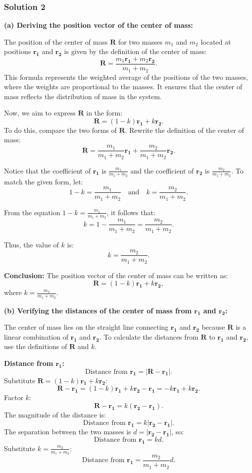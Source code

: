 \documentclass{article}
\begin{document}
\subsubsection{Solution 2}

\textbf{(a) Deriving the position vector of the center of mass:}

The position of the center of mass $\mathbf{R}$ for two masses $m_1$ and $m_2$ located at positions $\mathbf{r_1}$ and $\mathbf{r_2}$ is given by the definition of the center of mass:
\[
\mathbf{R} = \frac{m_1\mathbf{r_1} + m_2\mathbf{r_2}}{m_1 + m_2}.
\]
This formula represents the weighted average of the positions of the two masses, where the weights are proportional to the masses. It ensures that the center of mass reflects the distribution of mass in the system.

Now, we aim to express $\mathbf{R}$ in the form:
\[
\mathbf{R} = (1 - k)\mathbf{r_1} + k\mathbf{r_2}.
\]
To do this, compare the two forms of $\mathbf{R}$. Rewrite the definition of the center of mass:
\[
\mathbf{R} = \frac{m_1}{m_1 + m_2}\mathbf{r_1} + \frac{m_2}{m_1 + m_2}\mathbf{r_2}.
\]

Notice that the coefficient of $\mathbf{r_1}$ is $\frac{m_1}{m_1 + m_2}$ and the coefficient of $\mathbf{r_2}$ is $\frac{m_2}{m_1 + m_2}$. To match the given form, let:
\[
1 - k = \frac{m_1}{m_1 + m_2} \quad \text{and} \quad k = \frac{m_2}{m_1 + m_2}.
\]

From the equation $1 - k = \frac{m_1}{m_1 + m_2}$, it follows that:
\[
k = 1 - \frac{m_1}{m_1 + m_2} = \frac{m_2}{m_1 + m_2}.
\]

Thus, the value of $k$ is:
\[
k = \frac{m_2}{m_1 + m_2}.
\]

\textbf{Conclusion:} The position vector of the center of mass can be written as:
\[
\mathbf{R} = (1 - k)\mathbf{r_1} + k\mathbf{r_2},
\]
where $k = \frac{m_2}{m_1 + m_2}$.

\textbf{(b) Verifying the distances of the center of mass from $\mathbf{r_1}$ and $\mathbf{r_2}$:}

The center of mass lies on the straight line connecting $\mathbf{r_1}$ and $\mathbf{r_2}$ because $\mathbf{R}$ is a linear combination of $\mathbf{r_1}$ and $\mathbf{r_2}$. To calculate the distances from $\mathbf{R}$ to $\mathbf{r_1}$ and $\mathbf{r_2}$, use the definitions of $\mathbf{R}$ and $k$.

\textbf{Distance from $\mathbf{r_1}$:}
\[
\text{Distance from } \mathbf{r_1} = |\mathbf{R} - \mathbf{r_1}|.
\]
Substitute $\mathbf{R} = (1 - k)\mathbf{r_1} + k\mathbf{r_2}$:
\[
\mathbf{R} - \mathbf{r_1} = (1 - k)\mathbf{r_1} + k\mathbf{r_2} - \mathbf{r_1} = -k\mathbf{r_1} + k\mathbf{r_2}.
\]
Factor $k$:
\[
\mathbf{R} - \mathbf{r_1} = k(\mathbf{r_2} - \mathbf{r_1}).
\]
The magnitude of the distance is:
\[
\text{Distance from } \mathbf{r_1} = k|\mathbf{r_2} - \mathbf{r_1}|.
\]
The separation between the two masses is $d = |\mathbf{r_2} - \mathbf{r_1}|$, so:
\[
\text{Distance from } \mathbf{r_1} = k d.
\]
Substitute $k = \frac{m_2}{m_1 + m_2}$:
\[
\text{Distance from } \mathbf{r_1} = \frac{m_2}{m_1 + m_2} d.
\]
\end{document}
